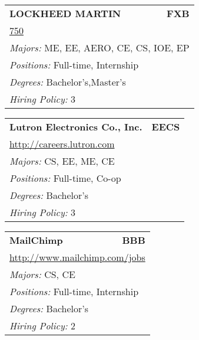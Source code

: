 \documentclass[twoside]{article}
\begin{document}
\begin{center}
\begin{multicols}{3}
\begin{FlushLeft}
\begin{minipage}{.9\columnwidth}
\end{minipage}
 
\begin{minipage}{.9\columnwidth}\begin{tabularx}{.95\columnwidth}{Xr}
                 {\Large\bf LOCKHEED MARTIN} & {\Large\bf FXB}\\
    \multicolumn{2}{p{.95\columnwidth}}{\url{750}}\\
    \multicolumn{2}{p{.95\columnwidth}}{\emph{Majors:} ME, EE, AERO, CE, CS, IOE, EP}\\
    \multicolumn{2}{p{.95\columnwidth}}{\emph{Positions:} Full-time, Internship}\\
    \multicolumn{2}{p{.95\columnwidth}}{\emph{Degrees:} Bachelor's,Master's}\\
    \multicolumn{2}{p{.95\columnwidth}}{\emph{Hiring Policy:} 3}\\
    \end{tabularx}
    
\end{minipage}
 
\begin{minipage}{.9\columnwidth}\begin{tabularx}{.95\columnwidth}{Xr}
                 {\Large\bf Lutron Electronics Co., Inc.} & {\Large\bf EECS}\\
    \multicolumn{2}{p{.95\columnwidth}}{\url{http://careers.lutron.com}}\\
    \multicolumn{2}{p{.95\columnwidth}}{\emph{Majors:} CS, EE, ME, CE}\\
    \multicolumn{2}{p{.95\columnwidth}}{\emph{Positions:} Full-time, Co-op}\\
    \multicolumn{2}{p{.95\columnwidth}}{\emph{Degrees:} Bachelor's}\\
    \multicolumn{2}{p{.95\columnwidth}}{\emph{Hiring Policy:} 3}\\
    \end{tabularx}
    
\end{minipage}
 
\begin{minipage}{.9\columnwidth}\begin{tabularx}{.95\columnwidth}{Xr}
                 {\Large\bf MailChimp} & {\Large\bf BBB}\\
    \multicolumn{2}{p{.95\columnwidth}}{\url{http://www.mailchimp.com/jobs}}\\
    \multicolumn{2}{p{.95\columnwidth}}{\emph{Majors:} CS, CE}\\
    \multicolumn{2}{p{.95\columnwidth}}{\emph{Positions:} Full-time, Internship}\\
    \multicolumn{2}{p{.95\columnwidth}}{\emph{Degrees:} Bachelor's}\\
    \multicolumn{2}{p{.95\columnwidth}}{\emph{Hiring Policy:} 2}\\
    \end{tabularx}
    

\end{minipage}
\end{FlushLeft}
\end{multicols}
\end{center}
\end{document}
